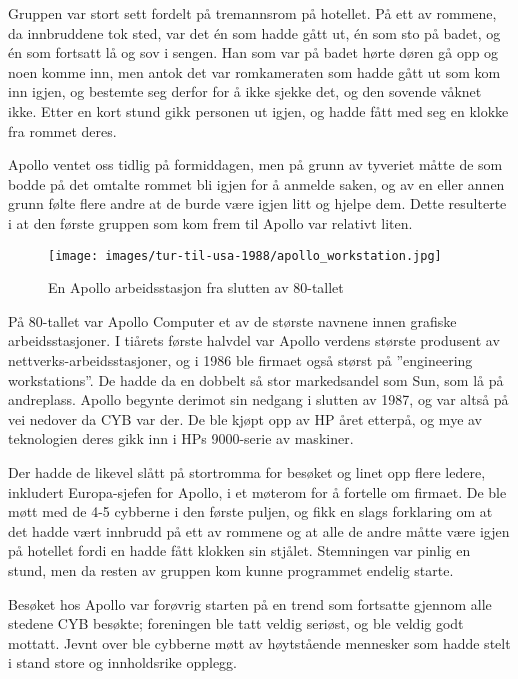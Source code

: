 Gruppen var stort sett fordelt på tremannsrom på hotellet. På ett av rommene, da innbruddene tok sted, var det én som hadde gått ut, én som sto på badet, og én som fortsatt lå og sov i sengen. Han som var på badet hørte døren gå opp og noen komme inn, men antok det var romkameraten som hadde gått ut som kom inn igjen, og bestemte seg derfor for å ikke sjekke det, og den sovende våknet ikke. Etter en kort stund gikk personen ut igjen, og hadde fått med seg en klokke fra rommet deres.

Apollo ventet oss tidlig på formiddagen, men på grunn av tyveriet måtte de som bodde på det omtalte rommet bli igjen for å anmelde saken, og av en eller annen grunn følte flere andre at de burde være igjen litt og hjelpe dem. Dette resulterte i at den første gruppen som kom frem til Apollo var relativt liten. 

\begin{wrapfigure}{l}{6.5cm}
	\centering
	\texttt{[image: images/tur-til-usa-1988/apollo\_workstation.jpg]}
	\caption{En Apollo arbeidsstasjon fra slutten av 80-tallet}
\end{wrapfigure}

På 80-tallet var Apollo Computer et av de største navnene innen grafiske arbeidsstasjoner. I tiårets første halvdel var Apollo verdens største produsent av nettverks-arbeidsstasjoner, og i 1986 ble firmaet også størst på ''engineering workstations''. De hadde da en dobbelt så stor markedsandel som Sun, som lå på andreplass. Apollo begynte derimot sin nedgang i slutten av 1987, og var altså på vei nedover da CYB var der. De ble kjøpt opp av HP året etterpå, og mye av teknologien deres gikk inn i HPs 9000-serie av maskiner.

Der hadde de likevel slått på stortromma for besøket og linet opp flere ledere, inkludert Europa-sjefen for Apollo, i et møterom for å fortelle om firmaet. De ble møtt med de 4-5 cybberne i den første puljen, og fikk en slags forklaring om at det hadde vært innbrudd på ett av rommene og at alle de andre måtte være igjen på hotellet fordi en hadde fått klokken sin stjålet. Stemningen var pinlig en stund, men da resten av gruppen kom kunne programmet endelig starte.

Besøket hos Apollo var forøvrig starten på en trend som fortsatte gjennom alle stedene CYB besøkte; foreningen ble tatt veldig seriøst, og ble veldig godt mottatt. Jevnt over ble cybberne møtt av høytstående mennesker som hadde stelt i stand store og innholdsrike opplegg. 

